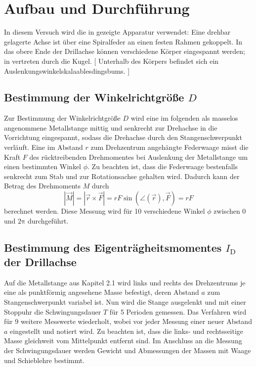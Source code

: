 \section{Aufbau und Durchführung} %
\label{sec:durchfhrung}


In diesem Versuch wird die in %
gezeigte Apparatur verwendet: 
Eine drehbar gelagerte Achse ist über eine Spiralfeder an einen festen Rahmen gekoppelt. 
In das obere Ende der Drillachse können verschiedene Körper eingespannt werden; 
in %
vertreten durch die Kugel. 
[ Unterhalb des Körpers befindet sich ein Auslenkungswinkelskalaablesdingsbums. ]



\subsection{Bestimmung der Winkelrichtgröße $D$}
Zur Bestimmung der Winkelrichtgröße $D$ wird eine im folgenden als masselos angenommene Metallstange mittig und senkrecht zur Drehachse in die Vorrichtung eingespannt, 
sodass die Drehachse durch den Stangenschwerpunkt verläuft. 
Eine im Abstand $r$ zum Drehzentrum angehängte Federwaage misst die Kraft $F$ des rücktreibenden Drehmomentes bei Auslenkung der Metallstange um einen bestimmten Winkel $\phi$. 
Zu beachten ist, dass die Federwaage bestenfalls senkrecht zum Stab und zur Rotationsachse gehalten wird. 
Dadurch kann der Betrag des Drehmoments $M$ durch
\begin{equation}
	| \vec{M} | = | \vec{r} \times \vec{F} | = r F \sin (\angle({\vec{r}}),
	\vec{F}) = r F
\end{equation}
berechnet werden.
Diese Messung wird für 10 verschiedene Winkel $\phi$ zwischen 0 und $2\mathup{\pi}$ durchgeführt. 

\subsection{Bestimmung des Eigenträgheitsmomentes $I_{\mathup{D}}$ der Drillachse}
Auf die Metallstange aus Kapitel 2.1 wird links und rechts des Drehzentrums je eine als punktförmig angesehene Masse befestigt, deren Abstand $a$ zum Stangenschwerpunkt variabel ist. 
Nun wird die Stange ausgelenkt und mit einer Stoppuhr die Schwingungsdauer $T$ für 5 Perioden gemessen. 
Das Verfahren wird für 9 weitere Messwerte wiederholt, wobei vor jeder Messung einer neuer Abstand $a$ eingestellt und notiert wird. 
Zu beachten ist, dass die links- und rechtsseitige Masse gleichweit vom Mittelpunkt entfernt sind. 
Im Anschluss an die Messung der Schwingungsdauer werden Gewicht und Abmessungen der Massen mit Waage und Schieblehre bestimmt.

